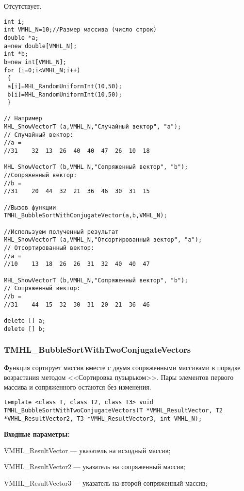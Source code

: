 \documentclass[a4paper,12pt]{article}
\begin{document}
Отсутствует.


\begin{lstlisting}[label=code_use_TMHL_BubbleSortWithConjugateVector,caption=Пример использования]
int i;
int VMHL_N=10;//Размер массива (число строк)
double *a;
a=new double[VMHL_N];
int *b;
b=new int[VMHL_N];
for (i=0;i<VMHL_N;i++)
 {
 a[i]=MHL_RandomUniformInt(10,50);
 b[i]=MHL_RandomUniformInt(10,50);
 }

// Например
MHL_ShowVectorT (a,VMHL_N,"Случайный вектор", "a");
// Случайный вектор:
//a =
//31	32	13	26	40	40	47	26	10	18

MHL_ShowVectorT (b,VMHL_N,"Сопряженный вектор", "b");
//Сопряженный вектор:
//b =
//31	20	44	32	21	36	46	30	31	15

//Вызов функции
TMHL_BubbleSortWithConjugateVector(a,b,VMHL_N);

//Используем полученный результат
MHL_ShowVectorT (a,VMHL_N,"Отсортированный вектор", "a");
// Отсортированный вектор:
//a =
//10	13	18	26	26	31	32	40	40	47

MHL_ShowVectorT (b,VMHL_N,"Сопряженный вектор", "b");
// Сопряженный вектор:
//b =
//31	44	15	32	30	31	20	21	36	46

delete [] a;
delete [] b;
\end{lstlisting}

\subsubsection{TMHL\_BubbleSortWithTwoConjugateVectors}\label{TMHL_BubbleSortWithTwoConjugateVectors}

Функция сортирует массив вместе с двумя сопряженными массивами в порядке возрастания методом <<Сортировка пузырьком>>. Пары элементов первого массива и сопряженного остаются без изменения.


\begin{lstlisting}[label=code_syntax_TMHL_BubbleSortWithTwoConjugateVectors,caption=Синтаксис]
template <class T, class T2, class T3> void TMHL_BubbleSortWithTwoConjugateVectors(T *VMHL_ResultVector, T2 *VMHL_ResultVector2, T3 *VMHL_ResultVector3, int VMHL_N);
\end{lstlisting}

\textbf{Входные параметры:}
 
VMHL\_ResultVector --- указатель на исходный массив;
 
VMHL\_ResultVector2 --- указатель на сопряженный массив;
 
VMHL\_ResultVector3 --- указатель на второй сопряженный массив;
 
\end{document}

